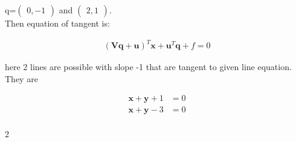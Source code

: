 \documentclass{article}
\newcommand{\myvec}[1]{\ensuremath{\begin{pmatrix}#1\end{pmatrix}}}
\let\vec\mathbf
\begin{document}
\begin{multicols}{2}
\begin{flushleft}
q=$\myvec{0,-1}$ and $\myvec{2,1}$.\\
Then equation of tangent is:
\end{flushleft}
\begin{align}
(\vec{V}\vec{q}+\vec{u})^T\vec{x}+\vec{u}^T\vec{q}+f=0
\end{align}
\begin{flushleft}
here 2 lines are possible with slope -1 that are tangent to given line equation.\\
They are\\ 
\end{flushleft}
\begin{align*}
\vec{x}+\vec{y}+1&=0\\
\vec{x}+\vec{y}-3&=0\\
\end{align*}
\end{multicols}{2}
\end{document}
